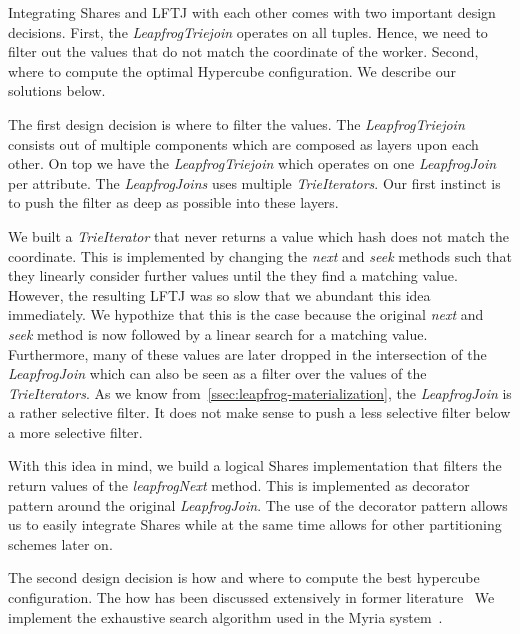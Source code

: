 Integrating Shares and \textsc{LFTJ} with each other comes with two important design decisions.
First, the \textit{LeapfrogTriejoin} operates on all tuples.
Hence, we need to filter out the values that do not match the coordinate of the worker.
Second, where to compute the optimal Hypercube configuration.
We describe our solutions below.


The first design decision is where to filter the values.
The \textit{LeapfrogTriejoin} consists out of multiple components which are composed as layers upon each other.
On top we have the \textit{LeapfrogTriejoin} which operates on one \textit{LeapfrogJoin} per attribute.
The \textit{LeapfrogJoins} uses multiple \textit{TrieIterators}.
Our first instinct is to push the filter as deep as possible into these layers.

We built a \textit{TrieIterator} that never returns a value which hash does not match the coordinate.
This is implemented by changing the \textit{next} and \textit{seek} methods such that they linearly
consider further values until the they find a matching value.
However, the resulting \textsc{LFTJ} was so slow that we abundant this idea immediately.
We hypothize that this is the case because the original \textit{next} and \textit{seek} method is now followed
by a linear search for a matching value.
Furthermore, many of these values are later dropped in the intersection of the \textit{LeapfrogJoin} which
can also be seen as a filter over the values of the \textit{TrieIterators}.
As we know from~\cref{ssec:leapfrog-materialization}, the \textit{LeapfrogJoin} is a rather selective filter.
It does not make sense to push a less selective filter below a more selective filter.

With this idea in mind, we build a logical Shares implementation that filters the return values of the \textit{leapfrogNext}
method.
This is implemented as decorator pattern around the original \textit{LeapfrogJoin}.
The use of the decorator pattern allows us to easily integrate Shares while at the same time allows for
other partitioning schemes later on.

The second design decision is how and where to compute the best hypercube configuration.
The how has been discussed extensively in former literature~\cite{shares,myria-detailed}
We implement the exhaustive search algorithm used in the Myria system~\cite{myria-detailed}.

